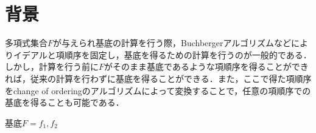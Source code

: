 \section{背景}
多項式集合$F$が与えられ\groebner{}基底の計算を行う際，Buchbergerアルゴリズムなどによりイデアルと項順序を固定し，\groebner{}基底を得るための計算を行うのが一般的である．
しかし，計算を行う前に$F$がそのまま\groebner{}基底であるような項順序を得ることができれば，従来の計算を行わずに\groebner{}基底を得ることができる．また，ここで得た項順序をchange of orderingのアルゴリズムによって変換することで，任意の項順序での\groebner{}基底を得ることも可能である．
\begin{theorem}
	\groebner{}基底$F = f_1, f_2$
\end{theorem}